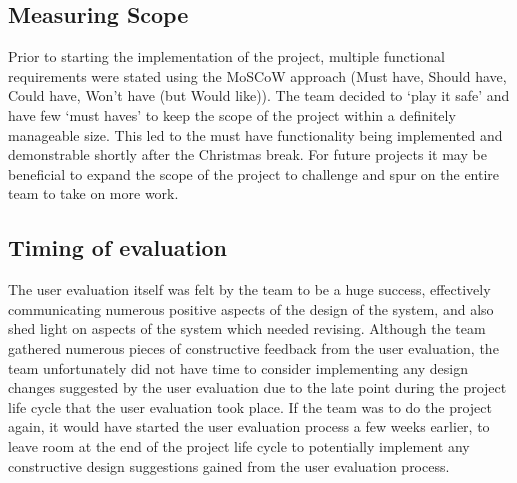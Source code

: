 \subsection{Measuring Scope}

Prior to starting the implementation of the project, multiple functional
requirements were stated using the MoSCoW approach (Must have, Should have,
Could have, Won't have (but Would like)). The team decided to `play it safe'
and have few `must haves' to keep the scope of the project within a definitely
manageable size. This led to the must have functionality being implemented
and demonstrable shortly after the Christmas break. For future projects it may
be beneficial to expand the scope of the project to challenge and spur on
the entire team to take on more work.

\subsection{Timing of evaluation}

The user evaluation itself was felt by the team to be a huge success, effectively communicating numerous positive aspects of the design of the system, and also shed light on aspects of the system which needed revising. Although the team gathered numerous pieces of constructive feedback from the user evaluation, the team unfortunately did not have time to consider implementing any design changes suggested by the user evaluation due to the late point during the project life cycle that the user evaluation took place. If the team was to do the project again, it would have started the user evaluation process a few weeks earlier, to leave room at the end of the project life cycle to potentially implement any constructive design suggestions gained from the user evaluation process.